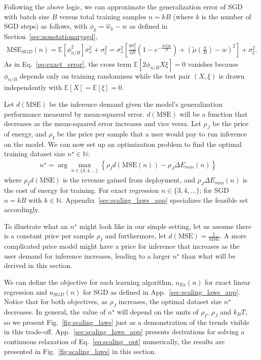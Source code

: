 \documentclass[12pt,onecolumn, margin=1in]{IEEEtran}
\newcommand{\bracket}[1]{\left[ #1 \right]}
\newcommand{\paren}[1]{\left( #1 \right)}
\newcommand{\N}[1]{\mathbb{N}^{#1}}
\newcommand{\E}[1]{\mathbb{E}\left[ #1 \right]}
\newcommand{\wh}{\hat{w}}
\newcommand{\sigx}{\sigma_x}
\newcommand{\sigxi}{\sigma_\xi}
\newcommand{\mse}{\mathrm{MSE}}
\begin{document}
Following the above logic, we can approximate the generalization error of SGD with batch size $B$ versus total training samples $n = kB$ (where $k$ is the number of SGD steps) as follows, with $\phi_k = \wh_k - w$ as defined in Section~\ref{sec:nonstationarysgd},
\begin{align}
\mse_{SGD}(n) = \E{\phi_{n/B}^2}\sigx^2 + \sigxi^2 = \sigx^2\bracket{\frac{\eta\sigxi^2}{2B}\paren{1 -e^{-\frac{2\sigx^2 \eta n}{B}}} + \paren{\tilde \mu\paren{\frac{n}{B}} - w}^2} + \sigxi^2.
\end{align}
As in Eq.~\eqref{eq:exact_error}, the cross term $\E{2\phi_{n/B} X \xi} = 0$ vanishes because $\phi_{n/B}$ depends only on training randomness while the test pair $(X, \xi)$ is drawn independently with $\E{X} = \E{\xi} = 0$.



Let $d(\mse)$ be the inference demand given the model's generalization performance measured by mean-squared error. $d(\mse)$ will be a function that decreases as the mean-squared error increases and vice versa. Let $\rho_{J}$ be the price of energy, and $\rho_{I}$ be the price per sample that a user would pay to run inference on the model. We can now set up an optimization problem to find the optimal training dataset size $n^\star \in \N{}$:
\begin{align}
n^\star = \arg\max_{n \in \{3,4,\ldots\}} \left\{ \rho_{I}d(\mse(n)) - \rho_{J}\Delta E_{min}(n) \right\} \label{eq:scaling_opt}
\end{align}
where $\rho_{I}d(\mse)$ is the revenue gained from deployment, and $\rho_{J}\Delta E_{min}\paren{n}$ is the cost of energy for training. For exact regression $n \in \{3, 4, \ldots\}$; for SGD $n = kB$ with $k \in \mathbb{N}$. Appendix~\ref{sec:scaling_laws_app} specializes the feasible set accordingly.

To illustrate what an $n^\star$ might look like in our simple setting, let us assume there is a constant price per sample $\rho_{I}$ and furthermore, let $d(\mse) = \frac{1}{\mse}$. A more complicated price model might have a price for inference that increases as the user demand for inference increases, leading to a larger $n^\star$ than what will be derived in this section.

We can define the objective for each learning algorithm, $u_{Ex}(n)$ for exact linear regression and $u_{SGD}( n)$ for SGD as defined in App.~\ref{sec:scaling_laws_app}. Notice that for both objectives, as $\rho_J$ increases, the optimal dataset size $n^\star$ decreases. In general, the value of $n^\star$ will depend on the units of $\rho_I$, $\rho_J$ and $k_B T$, so we present Fig.~\ref{fig:scaling_laws} just as a demonstration of the trends visible in this trade-off. App.~\ref{sec:scaling_laws_app} presents derivations for solving a continuous relaxation of Eq.~\eqref{eq:scaling_opt} numerically, the results are presented in Fig.~\ref{fig:scaling_laws} in this section.
\end{document}
